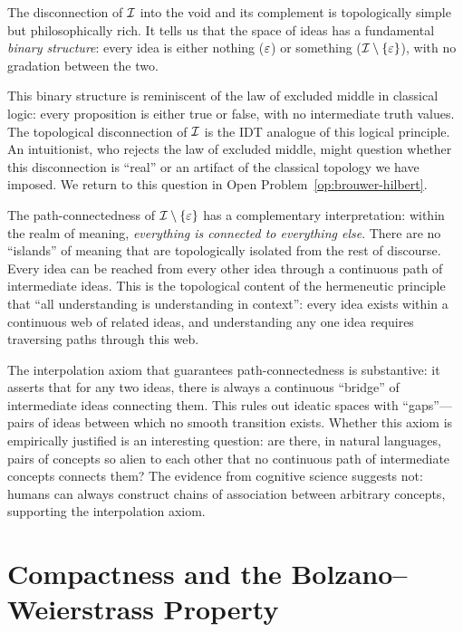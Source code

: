 \begin{remark}
The disconnection of $\mathcal{I}$ into the void and its complement is
topologically simple but philosophically rich.  It tells us that
the space of ideas has a fundamental \emph{binary structure}: every
idea is either nothing ($\varepsilon$) or something ($\mathcal{I} \setminus \{\varepsilon\}$),
with no gradation between the two.

This binary structure is reminiscent of the law of excluded middle in
classical logic: every proposition is either true or false, with no
intermediate truth values.  The topological disconnection of $\mathcal{I}$ is
the IDT analogue of this logical principle.  An intuitionist, who
rejects the law of excluded middle, might question whether this
disconnection is ``real'' or an artifact of the classical topology we
have imposed.  We return to this question in Open Problem~\ref{op:brouwer-hilbert}.

The path-connectedness of $\mathcal{I} \setminus \{\varepsilon\}$ has a complementary
interpretation: within the realm of meaning, \emph{everything is
connected to everything else}.  There are no ``islands'' of meaning
that are topologically isolated from the rest of discourse.  Every
idea can be reached from every other idea through a continuous path
of intermediate ideas.  This is the topological content of the
hermeneutic principle that ``all understanding is understanding in
context'': every idea exists within a continuous web of related ideas,
and understanding any one idea requires traversing paths through this web.

The interpolation axiom that guarantees path-connectedness is
substantive: it asserts that for any two ideas, there is always a
continuous ``bridge'' of intermediate ideas connecting them.  This
rules out ideatic spaces with ``gaps''---pairs of ideas between which
no smooth transition exists.  Whether this axiom is empirically
justified is an interesting question: are there, in natural languages,
pairs of concepts so alien to each other that no continuous path of
intermediate concepts connects them?  The evidence from cognitive science
suggests not: humans can always construct chains of association between
arbitrary concepts, supporting the interpolation axiom.
\end{remark}

\section{Compactness and the Bolzano--Weierstrass Property}
\label{sec:compactness}

